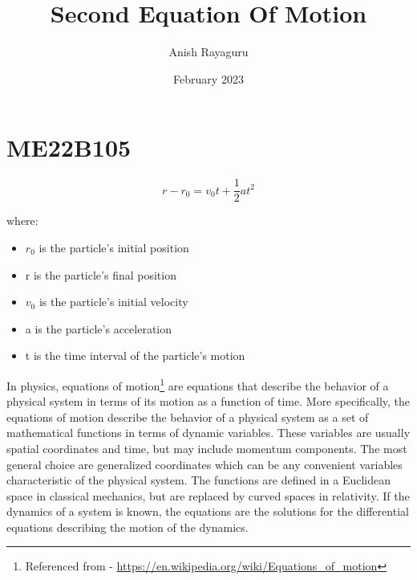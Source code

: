 \documentclass{article}
\title{Second Equation Of Motion}
\author{Anish Rayaguru}
\date{February 2023}
\begin{document}
\maketitle

\section{ME22B105}

\[ r-r_0 = v_0t + \frac{1}{2}at^2 \]

where:
\begin{itemize}
    \item $r_0$ is the particle's initial position
    \item r is the particle's final position
    \item $v_0$ is the particle's initial velocity
    \item a is the particle's acceleration
    \item t is the time interval of the particle's motion
\end{itemize}

In physics, equations of motion\footnote{Referenced from - \url{https://en.wikipedia.org/wiki/Equations_of_motion}} are equations that describe the behavior of a physical system in terms of its motion as a function of time. More specifically, the equations of motion describe the behavior of a physical system as a set of mathematical functions in terms of dynamic variables. These variables are usually spatial coordinates and time, but may include momentum components. The most general choice are generalized coordinates which can be any convenient variables characteristic of the physical system. The functions are defined in a Euclidean space in classical mechanics, but are replaced by curved spaces in relativity. If the dynamics of a system is known, the equations are the solutions for the differential equations describing the motion of the dynamics.




\begin{flushleft}

\end{flushleft}
\end{document}
